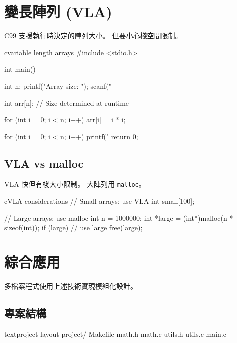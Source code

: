 
\section{變長陣列 (VLA)}

C99 支援執行時決定的陣列大小。 但要小心棧空間限制。

\begin{code}{c}{variable length arrays}
#include <stdio.h>

int main() {
    int n;
    printf("Array size: ");
    scanf("%

    int arr[n];  // Size determined at runtime

    for (int i = 0; i < n; i++) {
        arr[i] = i * i;
    }

    for (int i = 0; i < n; i++) {
        printf("%
    }
    return 0;
}
\end{code}

\subsection*{VLA vs malloc}

VLA 快但有棧大小限制。 大陣列用 \texttt{malloc}。

\begin{code}{c}{VLA considerations}
// Small arrays: use VLA
int small[100];

// Large arrays: use malloc
int n = 1000000;
int *large = (int*)malloc(n * sizeof(int));
if (large) {
    // use large
    free(large);
}
\end{code}


\section{綜合應用}

多檔案程式使用上述技術實現模組化設計。

\subsection*{專案結構}

\begin{code}{text}{project layout}
project/
  Makefile
  math.h
  math.c
  utils.h
  utils.c
  main.c
\end{code}

